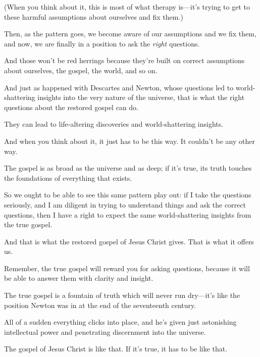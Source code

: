 \begin{compactitem}
\begin{compactitem}
\begin{compactitem}
							\item (When you think about it, this is most of what therapy is---it's trying to get to these harmful assumptions about ourselves and fix them.)
							\item Then, as the pattern goes, we become aware of our assumptions and we fix them, and now, we are finally in a position to ask the \textit{right} questions.
							\item And those won't be red herrings because they're built on correct assumptions about ourselves, the gospel, the world, and so on.
							\item And just as happened with Descartes and Newton, whose questions led to world-shattering insights into the very nature of the universe, that is what the right questions about the restored gospel can do.
							\item They can lead to life-altering discoveries and world-shattering insights.
							\item And when you think about it, it just has to be this way. It couldn't be any other way.
							\item The gospel is as broad as the universe and as deep; if it's true, its truth touches the foundations of everything that exists.
							\item So we ought to be able to see this same pattern play out: if I take the questions seriously, and I am diligent in trying to understand things and ask the correct questions, then I have a right to expect the same world-shattering insights from the true gospel.
							\item And that is what the restored gospel of Jesus Christ gives. That is what it offers us.
							\item Remember, the true gospel will reward you for asking questions, because it will be able to answer them with clarity and insight.
							\item The true gospel is a fountain of truth which will never run dry---it's like the position Newton was in at the end of the seventeenth century.
							\item All of a sudden everything clicks into place, and he's given just astonishing intellectual power and penetrating discernment into the universe.
							\item The gospel of Jesus Christ is like that. If it's true, it has to be like that. 
						\end{compactitem}
				\end{compactitem}
				

\end{compactitem}
